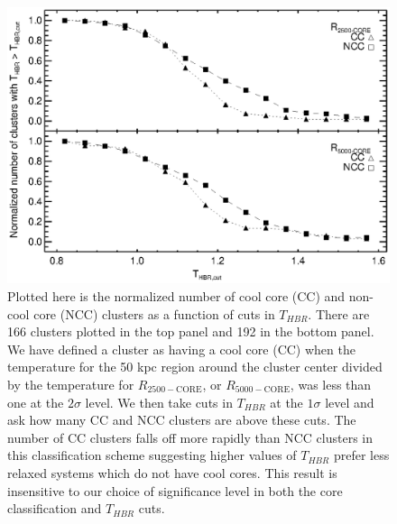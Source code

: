 \clearpage
\begin{figure}
\begin{center}
\includegraphics*[width=\textwidth, trim=15mm 10mm 0mm 0mm, clip]{f7.eps}
\caption{
Plotted here is the normalized number of cool core (CC) and non-cool core
(NCC) clusters as a function of cuts in $T_{HBR}$. There are 166
clusters plotted in the top panel and 192 in the bottom panel. We have
defined a cluster as having a cool core (CC) when the temperature for
the 50 kpc region around the cluster center divided by the temperature
for $R_{2500-\mathrm{CORE}}$, or $R_{5000-\mathrm{CORE}}$, was less
than one at the $2\sigma$ level. We then take cuts in $T_{HBR}$ at the
$1\sigma$ level and ask how many CC and NCC clusters are above these
cuts. The number of CC clusters falls off more rapidly than NCC
clusters in this classification scheme suggesting higher values of
$T_{HBR}$ prefer less relaxed systems which do not have cool
cores. This result is insensitive to our choice of significance level
in both the core classification and $T_{HBR}$ cuts.
}
\label{fig:cc_ncc_bin}
\end{center}
\end{figure}
\clearpage

